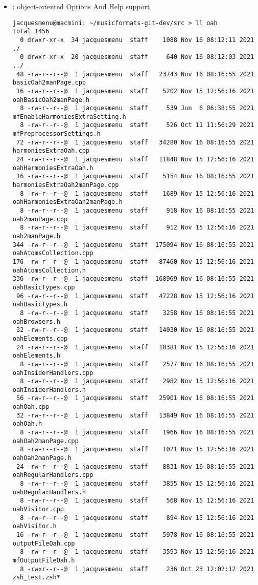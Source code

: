 \begin{itemize}
\item {} : object-oriented Options And Help support
\begin{lstlisting}[language=Terminal]
jacquesmenu@macmini: ~/musicformats-git-dev/src > ll oah
total 1456
  0 drwxr-xr-x  34 jacquesmenu  staff    1088 Nov 16 08:12:11 2021 ./
  0 drwxr-xr-x  20 jacquesmenu  staff     640 Nov 16 08:12:03 2021 ../
 48 -rw-r--r--@  1 jacquesmenu  staff   23743 Nov 16 08:16:55 2021 basicOah2manPage.cpp
 16 -rw-r--r--@  1 jacquesmenu  staff    5202 Nov 15 12:56:16 2021 oahBasicOah2manPage.h
  8 -rw-r--r--@  1 jacquesmenu  staff     539 Jun  6 06:38:55 2021 mfEnableHarmoniesExtraSetting.h
  8 -rw-r--r--@  1 jacquesmenu  staff     526 Oct 11 11:56:29 2021 mfPreprocessorSettings.h
 72 -rw-r--r--@  1 jacquesmenu  staff   34280 Nov 16 08:16:55 2021 harmoniesExtraOah.cpp
 24 -rw-r--r--@  1 jacquesmenu  staff   11848 Nov 15 12:56:16 2021 oahHarmoniesExtraOah.h
 16 -rw-r--r--@  1 jacquesmenu  staff    5154 Nov 16 08:16:55 2021 harmoniesExtraOah2manPage.cpp
  8 -rw-r--r--@  1 jacquesmenu  staff    1689 Nov 15 12:56:16 2021 oahHarmoniesExtraOah2manPage.h
  8 -rw-r--r--@  1 jacquesmenu  staff     918 Nov 16 08:16:55 2021 oah2manPage.cpp
  8 -rw-r--r--@  1 jacquesmenu  staff     912 Nov 15 12:56:16 2021 oah2manPage.h
344 -rw-r--r--@  1 jacquesmenu  staff  175094 Nov 16 08:16:55 2021 oahAtomsCollection.cpp
176 -rw-r--r--@  1 jacquesmenu  staff   87460 Nov 15 12:56:16 2021 oahAtomsCollection.h
336 -rw-r--r--@  1 jacquesmenu  staff  168969 Nov 16 08:16:55 2021 oahBasicTypes.cpp
 96 -rw-r--r--@  1 jacquesmenu  staff   47228 Nov 15 12:56:16 2021 oahBasicTypes.h
  8 -rw-r--r--@  1 jacquesmenu  staff    3258 Nov 16 08:16:55 2021 oahBrowsers.h
 32 -rw-r--r--@  1 jacquesmenu  staff   14030 Nov 16 08:16:55 2021 oahElements.cpp
 24 -rw-r--r--@  1 jacquesmenu  staff   10381 Nov 15 12:56:16 2021 oahElements.h
  8 -rw-r--r--@  1 jacquesmenu  staff    2577 Nov 16 08:16:55 2021 oahInsiderHandlers.cpp
  8 -rw-r--r--@  1 jacquesmenu  staff    2982 Nov 15 12:56:16 2021 oahInsiderHandlers.h
 56 -rw-r--r--@  1 jacquesmenu  staff   25901 Nov 16 08:16:55 2021 oahOah.cpp
 32 -rw-r--r--@  1 jacquesmenu  staff   13849 Nov 16 08:16:55 2021 oahOah.h
  8 -rw-r--r--@  1 jacquesmenu  staff    1966 Nov 16 08:16:55 2021 oahOah2manPage.cpp
  8 -rw-r--r--@  1 jacquesmenu  staff    1021 Nov 15 12:56:16 2021 oahOah2manPage.h
 24 -rw-r--r--@  1 jacquesmenu  staff    8831 Nov 16 08:16:55 2021 oahRegularHandlers.cpp
  8 -rw-r--r--@  1 jacquesmenu  staff    3855 Nov 15 12:56:16 2021 oahRegularHandlers.h
  8 -rw-r--r--@  1 jacquesmenu  staff     568 Nov 15 12:56:16 2021 oahVisitor.cpp
  8 -rw-r--r--@  1 jacquesmenu  staff     894 Nov 15 12:56:16 2021 oahVisitor.h
 16 -rw-r--r--@  1 jacquesmenu  staff    5978 Nov 16 08:16:55 2021 outputFileOah.cpp
  8 -rw-r--r--@  1 jacquesmenu  staff    3593 Nov 15 12:56:16 2021 mfOutputFileOah.h
  8 -rwxr--r--@  1 jacquesmenu  staff     236 Oct 23 12:02:12 2021 zsh_test.zsh*
\end{lstlisting}


\end{itemize}
